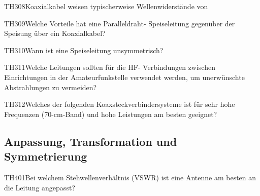 \begin{question}{TH308}{Koaxialkabel weisen typischerweise Wellenwiderstände von}
\end{question}

\begin{question}{TH309}{Welche Vorteile hat eine Paralleldraht- Speiseleitung gegenüber der Speisung über ein Koaxialkabel?}
\end{question}

\begin{question}{TH310}{Wann ist eine Speiseleitung unsymmetrisch?}
\end{question}

\begin{question}{TH311}{Welche Leitungen sollten für die HF- Verbindungen zwischen Einrichtungen in der Amateurfunkstelle verwendet werden, um unerwünschte Abstrahlungen zu vermeiden?}
\end{question}

\begin{question}{TH312}{Welches der folgenden Koaxsteckverbindersysteme ist für sehr hohe Frequenzen (70-cm-Band) und hohe Leistungen am besten geeignet?}
\end{question}

\subsection{Anpassung, Transformation und Symmetrierung}

\begin{question}{TH401}{Bei welchem Stehwellenverhältnis (VSWR) ist eine Antenne am besten an die Leitung angepasst?}
\end{question}

